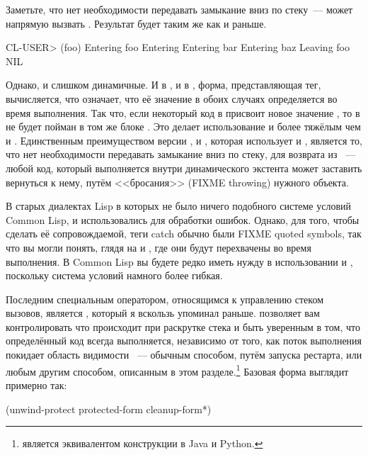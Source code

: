 Заметьте, что нет необходимости передавать замыкание вниз по стеку~---  может
напрямую вызвать .  Результат будет таким же как и раньше.

\begin{myverb}
  CL-USER> (foo)
  Entering foo
   Entering 
    Entering bar
     Entering baz
  Leaving foo
  NIL
\end{myverb}

Однако,  и  слишком динамичные.  И в , и в
, форма, представляющая тег, вычисляется, что означает, что её значение в
обоих случаях определяется во время выполнения.  Так что, если некоторый код в 
присвоит новое значение , то  в  не будет пойман в том
же блоке .  Это делает использование  и  более тяжёлым
чем  и . Единственным преимуществом версии ,
 и , которая использует  и , является то, что
нет необходимости передавать замыкание вниз по стеку, для возврата из ~---
любой код, который выполняется внутри динамического экстента  может заставить
вернуться к нему, путём <<бросания>> (FIXME throwing) нужного объекта.

В старых диалектах Lisp в которых не было ничего подобного системе условий Common Lisp,
 и  использовались для обработки ошибок.  Однако, для того, чтобы
сделать её сопровождаемой, теги catch обычно были FIXME quoted symbols, так что вы могли
понять, глядя на  и , где они будут перехвачены во время
выполнения. В Common Lisp вы будете редко иметь нужду в использовании  и
, поскольку система условий намного более гибкая.

Последним специальным оператором, относящимся к управлению стеком вызовов, является
, который я вскользь упоминал раньше.  позволяет
вам контролировать что происходит при раскрутке стека и быть уверенным в том, что
определённый код всегда выполняется, независимо от того, как поток выполнения покидает
область видимости ~--- обычным способом, путём запуска рестарта, или
любым другим способом, описанным в этом разделе.\footnote{ является
  эквивалентом конструкции  в Java и Python.}  Базовая форма
 выглядит примерно так:

\begin{myverb}
(unwind-protect protected-form
  cleanup-form*)
\end{myverb}

